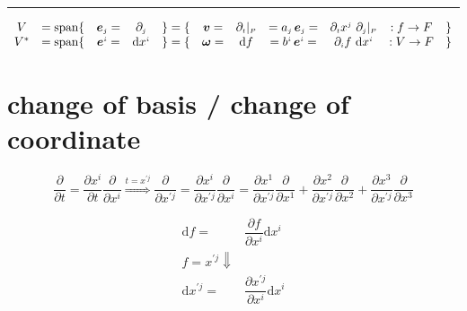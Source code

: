 \documentclass[
]{book}
\theoremstyle{definition}
\theoremstyle{definition}
\theoremstyle{definition}
\theoremstyle{definition}
\theoremstyle{remark}
\begin{document}
\begin{center}\rule{0.5\linewidth}{0.5pt}\end{center}

\[
\begin{array}{ccccccccccc}
V & =\mathrm{span}\{ & \boldsymbol{e}_{{\scriptscriptstyle j}}= & \partial_{{\scriptscriptstyle j}} & \}=\{ & \boldsymbol{v}= & \partial_{{\scriptscriptstyle t}}|_{{\scriptscriptstyle P}} & =a_{{\scriptscriptstyle j}}\thinspace\boldsymbol{e}_{{\scriptscriptstyle j}}= & \partial_{{\scriptscriptstyle t}}x^{{\scriptscriptstyle j}}\ \partial_{{\scriptscriptstyle j}}|_{{\scriptscriptstyle P}} & :f\rightarrow F & \}\\
V^{*} & =\mathrm{span}\{ & \boldsymbol{e}^{{\scriptscriptstyle i}}= & \mathrm{d}x^{{\scriptscriptstyle i}} & \}=\{ & \boldsymbol{\omega}= & \mathrm{d}f & =b^{{\scriptscriptstyle i}}\thinspace\boldsymbol{e}^{{\scriptscriptstyle i}}= & \partial_{{\scriptscriptstyle i}}f\ \mathrm{d}x^{{\scriptscriptstyle i}} & :V\rightarrow F & \}
\end{array}
\]

\hypertarget{change-of-basis-change-of-coordinate}{%
\section{change of basis / change of coordinate}\label{change-of-basis-change-of-coordinate}}

\[
\dfrac{\partial}{\partial t}=\dfrac{\partial x^{{\scriptscriptstyle i}}}{\partial t}\dfrac{\partial}{\partial x^{{\scriptscriptstyle i}}}\overset{t=x^{\prime{\scriptscriptstyle j}}}{\Rightarrow}\dfrac{\partial}{\partial x^{\prime{\scriptscriptstyle j}}}=\dfrac{\partial x^{{\scriptscriptstyle i}}}{\partial x^{\prime{\scriptscriptstyle j}}}\dfrac{\partial}{\partial x^{{\scriptscriptstyle i}}}=\dfrac{\partial x^{{\scriptscriptstyle 1}}}{\partial x^{\prime{\scriptscriptstyle j}}}\dfrac{\partial}{\partial x^{{\scriptscriptstyle 1}}}+\dfrac{\partial x^{{\scriptscriptstyle 2}}}{\partial x^{\prime{\scriptscriptstyle j}}}\dfrac{\partial}{\partial x^{{\scriptscriptstyle 2}}}+\dfrac{\partial x^{{\scriptscriptstyle 3}}}{\partial x^{\prime{\scriptscriptstyle j}}}\dfrac{\partial}{\partial x^{{\scriptscriptstyle 3}}}
\]

\[
\begin{aligned}
\mathrm{d}f= & \dfrac{\partial f}{\partial x^{{\scriptscriptstyle i}}}\mathrm{d}x^{{\scriptscriptstyle i}}\\
f=x^{\prime{\scriptscriptstyle j}}\Downarrow\\
\mathrm{d}x^{\prime{\scriptscriptstyle j}}= & \dfrac{\partial x^{\prime{\scriptscriptstyle j}}}{\partial x^{{\scriptscriptstyle i}}}\mathrm{d}x^{{\scriptscriptstyle i}}
\end{aligned}
\]
\end{document}

